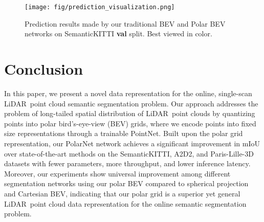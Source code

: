 \documentclass[10pt,twocolumn,letterpaper]{article}
\newcommand{\lidar}{\mbox{LiDAR }}
\begin{document}
\begin{figure*}
\centering
  \texttt{[image: fig/prediction\_visualization.png]}
  \caption{Prediction results made by our traditional BEV and Polar BEV networks on SemanticKITTI \textbf{val} split. Best viewed in color.}
  \label{fig:qualitative}
\end{figure*}
\fi 


\section{Conclusion}

In this paper, we present a novel data representation for the online, single-scan \lidar point cloud semantic segmentation problem. Our approach addresses the problem of long-tailed spatial distribution of \lidar point clouds by quantizing points into polar bird's-eye-view (BEV) grids, where we encode points into fixed size representations through a trainable PointNet. Built upon the polar grid representation, our PolarNet network achieves a significant improvement in mIoU over state-of-the-art methods on the SemanticKITTI, A2D2, and Paris-Lille-3D datasets with fewer parameters, more throughput, and lower inference latency. Moreover, our experiments show universal improvement among different segmentation networks using our polar BEV compared to spherical projection and Cartesian BEV, indicating that our polar grid is a superior yet general \lidar point cloud data representation for the online semantic segmentation problem.

\clearpage
{\small


}
\end{document}
